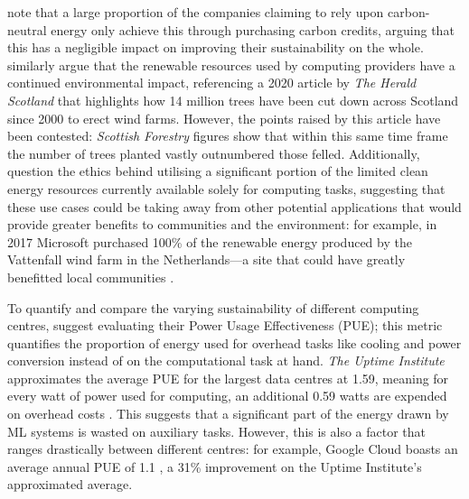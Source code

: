 \documentclass[a4paper, 12pt]{article}
\begin{document}
     note that a large proportion of the companies claiming to rely upon carbon-neutral energy only achieve this through purchasing carbon credits, arguing that this has a negligible impact on improving their sustainability on the whole.  similarly argue that the renewable resources used by computing providers have a continued environmental impact, referencing a 2020 article by \emph{The Herald Scotland} that highlights how 14 million trees have been cut down across Scotland since 2000 to erect wind farms. However, the points raised by this article have been contested: \emph{Scottish Forestry} figures show that within this same time frame the number of trees planted vastly outnumbered those felled. Additionally,  question the ethics behind utilising a significant portion of the limited clean energy resources currently available solely for computing tasks, suggesting that these use cases could be taking away from other potential applications that would provide greater benefits to communities and the environment: for example, in 2017 Microsoft purchased 100\% of the renewable energy produced by the Vattenfall wind farm in the Netherlands---a site that could have greatly benefitted local communities \cite{microsoft-news}.

    To quantify and compare the varying sustainability of different computing centres,  suggest evaluating their Power Usage Effectiveness (PUE); this metric quantifies the proportion of energy used for overhead tasks like cooling and power conversion instead of on the computational task at hand. \emph{The Uptime Institute} approximates the average PUE for the largest data centres at 1.59, meaning for every watt of power used for computing, an additional 0.59 watts are expended on overhead costs \cite{data-center-survey}. This suggests that a significant part of the energy drawn by ML systems is wasted on auxiliary tasks. However, this is also a factor that ranges drastically between different centres: for example, Google Cloud boasts an average annual PUE of 1.1 \cite{google-2021}, a 31\% improvement on the Uptime Institute's approximated average.
\end{document}
